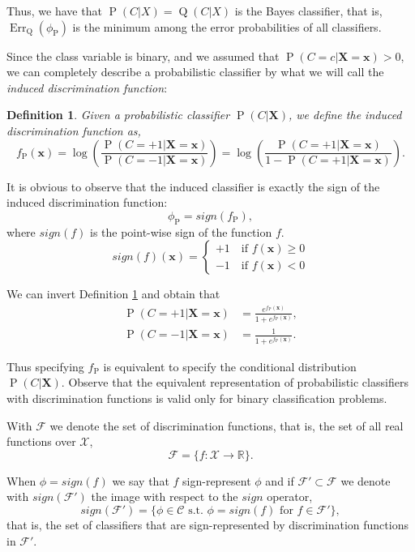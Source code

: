 \documentclass[11pt,a4paper, twoside]{book}
\newtheorem{definition}{Definition}[chapter]
\newcommand{\Pp}{\operatorname{P}}
\newcommand{\Pq}{\operatorname{Q}}
\newcommand{\bx}{\mathbf{x}}
\newcommand{\bX}{\mathbf{X}}
\newcommand{\bchi}{\boldsymbol{\mathcal{X}}}
\begin{document}
Thus, we have that $\Pp(C|X) = \Pq(C|X)$ is the Bayes classifier, that is, $\operatorname{Err}_{\Pq}(\phi_{\Pp})$ is the minimum among the error probabilities of all classifiers.

Since the class variable is binary, and we assumed that $\Pp(C=c | \bX = \bx) >0 $, we can completely describe a probabilistic classifier by what we will call the \textit{induced discrimination function}:

\begin{definition}
\label{def:discrimination}
Given a probabilistic classifier $\Pp(C|\bX)$, we define the induced discrimination function as,
$$ f_{\Pp}(\bx) = \log\left( \frac{\Pp(C=+1 | \bX = \bx) }{\Pp(C=-1 | \bX = \bx) } \right) = \log\left( \frac{\Pp(C=+1 | \bX = \bx) }{1-\Pp(C=+1 | \bX = \bx) } \right). $$
\end{definition}

It is obvious to observe that the induced classifier is exactly the sign of the induced discrimination function:
$$ \phi_{\Pp} = sign(f_{\Pp}), $$
where $sign(f)$ is the point-wise sign of the function $f$.
$$ sign(f)(\bx) = \left\{ \begin{array}{c}

+1  \quad \text{if } f(\bx)\geq 0 \\ 
-1  \quad \text{if } f(\bx) < 0

\end{array}\right. $$



We can invert Definition \ref{def:discrimination} and obtain that
\begin{align*}
 \Pp(C = +1 | \bX = \bx) &= \frac{e^{f_{\Pp}(\bx)}}{1+e^{f_{\Pp}(\bx)}}, \\
  \Pp(C = -1 | \bX = \bx) &= \frac{1}{1+e^{f_{\Pp}(\bx)}}.
\end{align*}

Thus specifying $f_{\Pp}$ is equivalent to specify the conditional distribution $\Pp(C|\bX)$. Observe that the equivalent representation of probabilistic classifiers with discrimination functions is valid only for binary classification problems.

With $\mathcal{F}$ we denote the set of discrimination functions, that is, the set of all real functions over $\bchi$,
 $$\mathcal{F} = \{ f: \bchi \to \mathbb{R} \}.$$
 
 When $\phi = sign(f)$ we say that $f$ sign-represent $\phi$ and if $\mathcal{F}' \subset \mathcal{F}$ we denote with $sign(\mathcal{F}')$ the image with respect to the $sign$ operator,
$$sign(\mathcal{F}') = \{ \phi \in \mathcal{C} \text{ s.t. } \phi = sign(f) \text{ for } f \in \mathcal{F}' \}, $$
that is, the set of classifiers that are sign-represented by discrimination functions in $\mathcal{F}'$. 
\end{document}
